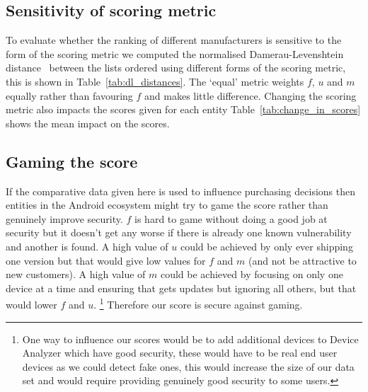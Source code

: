 \subsection{Sensitivity of scoring metric}
\daTabDLDistances
\daTabChangeInScores
To evaluate whether the ranking of different manufacturers is sensitive to the form of the scoring metric we computed the normalised Damerau-Levenshtein distance~\cite{Bard2007} between the lists ordered using different forms of the scoring metric, this is shown in Table~\ref{tab:dl_distances}.
The `equal' metric weights $f$, $u$ and $m$ equally rather than favouring $f$ and makes little difference.
Changing the scoring metric also impacts the scores given for each entity Table~\ref{tab:change_in_scores} shows the mean impact on the scores.

\subsection{Gaming the score}
If the comparative data given here is used to influence purchasing decisions then entities in the Android ecosystem might try to game the score rather than genuinely improve security.
$f$ is hard to game without doing a good job at security but it doesn't get any worse if there is already one known vulnerability and another is found.
A high value of $u$ could be achieved by only ever shipping one version but that would give low values for $f$ and $m$ (and not be attractive to new customers).
A high value of $m$ could be achieved by focusing on only one device at a time and ensuring that gets updates but ignoring all others, but that would lower $f$ and $u$.%
\footnote{One way to influence our scores would be to add additional devices to Device Analyzer which have good security, these would have to be real end user devices as we could detect fake ones, this would increase the size of our data set and would require providing genuinely good security to some users.}
Therefore our score is secure against gaming.